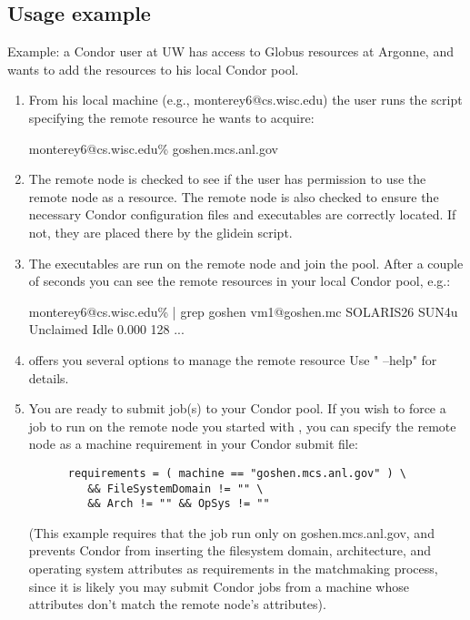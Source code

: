 \subsection{Usage example}
Example: a Condor user at UW has access to Globus resources at 
Argonne, and wants to add the resources to his local Condor pool.

\begin{enumerate}

\item From his local machine (e.g., monterey6@cs.wisc.edu) the user runs 
   the  script specifying the remote resource he wants 
   to acquire:

monterey6@cs.wisc.edu\%  goshen.mcs.anl.gov

\item The remote node is checked to see if the user has permission to
   use the remote node as a resource. The remote node is also checked
   to ensure the necessary Condor configuration files and executables
   are correctly located. If not, they are placed there by the glidein
   script.

\item The executables are run on the remote node and join the pool.
   After a couple of seconds you can see the remote resources in your 
   local Condor pool, e.g.:

   monterey6@cs.wisc.edu\%  | grep goshen
      vm1@goshen.mc SOLARIS26   SUN4u  Unclaimed  Idle       0.000   128 ...

\item {} offers you several options to manage the remote resource
   Use " --help" for details.

\item You are ready to submit job(s) to your Condor pool. If you wish to force
   a job to run on the remote node you started with , you can
   specify the remote node as a machine requirement in your Condor submit
   file: 
\begin{verbatim}
      requirements = ( machine == "goshen.mcs.anl.gov" ) \
         && FileSystemDomain != "" \
         && Arch != "" && OpSys != ""
\end{verbatim}
   (This example requires that the job run only on goshen.mcs.anl.gov, and
   prevents Condor from inserting the filesystem domain, architecture, and 
   operating system attributes as requirements in the matchmaking process,
   since it is likely you may submit Condor jobs from a machine whose
   attributes don't match the remote node's attributes).

\end{enumerate}

